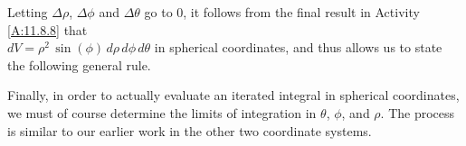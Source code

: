 Letting $\Delta \rho$, $\Delta \phi$ and $\Delta \theta$ go to 0, it follows from the final result in
Activity \ref{A:11.8.8} that\\ $dV = \rho^2 \, \sin(\phi) \, d\rho \, d\phi \, d\theta$ in spherical coordinates, and thus allows us to state the following general rule.

\vspace*{5pt}
\nin {}
\vspace*{5pt}

Finally, in order to actually evaluate an iterated integral in spherical coordinates, we must of course determine the limits of integration in $\theta$, $\phi$,  and $\rho$.  The process is similar to our earlier work in the other two coordinate systems.

%



